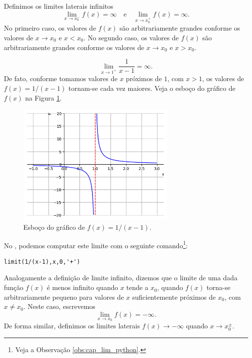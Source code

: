 Definimos os limites laterais infinitos
\begin{equation}
  \lim_{x\to x_0^-} f(x) = \infty\quad\text{e}\quad\lim_{x\to x_0^+} f(x) = \infty.
\end{equation}
No primeiro caso, os valores de $f(x)$ são arbitrariamente grandes conforme os valores de $x\to x_0$ e $x<x_0$. No segundo caso, os valores de $f(x)$ são arbitrariamente grandes conforme os valores de $x\to x_0$ e $x>x_0$.

\begin{ex}
  \begin{equation}
    \lim_{x\to 1^+} \frac{1}{x-1} = \infty.
  \end{equation}
  De fato, conforme tomamos valores de $x$ próximos de $1$, com $x>1$, os valores de $f(x) = 1/(x-1)$ tornam-se cada vez maiores. Veja o esboço do gráfico de $f(x)$ na Figura \ref{fig:ex_liminf_1x}.

\begin{figure}[H]
  \centering
  \includegraphics[width=0.7\textwidth]{./cap_lim/dados/fig_ex_liminf_1x/fig_ex_liminf_1x}
  \caption{Esboço do gráfico de $f(x)=1/(x-1)$.}
  \label{fig:ex_liminf_1x}
\end{figure}  

\ifispython
  No \sympy, podemos computar este limite com o seguinte comando\footnote{Veja a Observação \ref{obs:cap_lim_python}.}:
\begin{verbatim}
limit(1/(x-1),x,0,'+')
\end{verbatim}
\fi
\end{ex}


Analogamente a definição de limite infinito, dizemos que o limite de uma dada função $f(x)$ é menos infinito quando $x$ tende a $x_0$, quando $f(x)$ torna-se arbitrariamente pequeno para valores de $x$ suficientemente próximos de $x_0$, com $x\neq x_0$. Neste caso, escrevemos
\begin{equation}
  \lim_{x\to x_0} f(x) = -\infty.
\end{equation}
De forma similar, definimos os limites laterais $f(x)\to -\infty$ quando $x\to x_0^{\pm}$.

